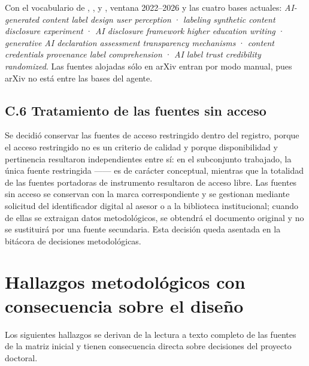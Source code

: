 \documentclass[letter,12pt]{article}
\begin{document}
Con el vocabulario de \citet{gamage2025}, \citet{wittenberg2025}, \citet{perezperez2026} y \citet{micallef2026}, ventana 2022--2026 y las cuatro bases actuales: \textit{AI-generated content label design user perception} · \textit{labeling synthetic content disclosure experiment} · \textit{AI disclosure framework higher education writing} · \textit{generative AI declaration assessment transparency mechanisms} · \textit{content credentials provenance label comprehension} · \textit{AI label trust credibility randomized}. Las fuentes alojadas sólo en arXiv entran por modo manual, pues arXiv no está entre las bases del agente.

\subsection*{C.6 Tratamiento de las fuentes sin acceso}

Se decidió conservar las fuentes de acceso restringido dentro del registro, porque el acceso restringido no es un criterio de calidad y porque disponibilidad y pertinencia resultaron independientes entre sí: en el subconjunto trabajado, la única fuente restringida ---\citet{grunert2007modelo}--- es de carácter conceptual, mientras que la totalidad de las fuentes portadoras de instrumento resultaron de acceso libre. Las fuentes sin acceso se conservan con la marca correspondiente y se gestionan mediante solicitud del identificador digital al asesor o a la biblioteca institucional; cuando de ellas se extraigan datos metodológicos, se obtendrá el documento original y no se sustituirá por una fuente secundaria. Esta decisión queda asentada en la bitácora de decisiones metodológicas.

\section{Hallazgos metodológicos con consecuencia sobre el diseño}\label{anx:hallazgos}

Los siguientes hallazgos se derivan de la lectura a texto completo de las fuentes de la matriz inicial y tienen consecuencia directa sobre decisiones del proyecto doctoral.
\end{document}
